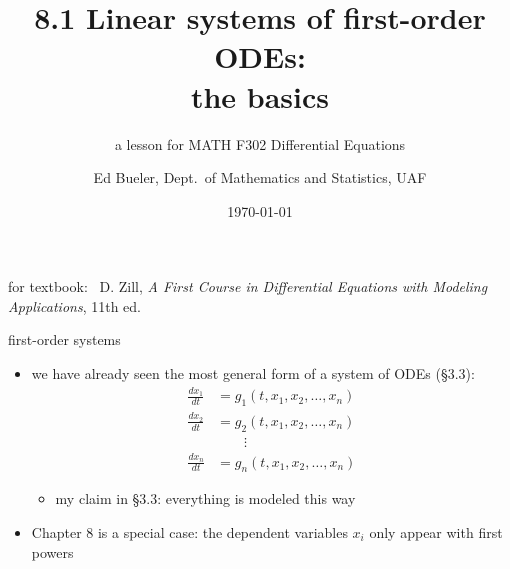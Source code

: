 \documentclass[urlcolor=blue,dvipsnames]{beamer}
\title{8.1 Linear systems of first-order ODEs: \\ the basics}
\subtitle{a lesson for MATH F302 Differential Equations}
\author{Ed Bueler, Dept.~of Mathematics and Statistics, UAF}
\date{\tiny \today}
\begin{document}
\renewcommand{\thefootnote}{{\color{green} \arabic{footnote}}}

\begin{frame}
\titlepage

\centerline{\tiny for textbook: \, D. Zill, \emph{A First Course in Differential Equations with Modeling Applications}, 11th ed.}
\end{frame}

\newcommand{\LL}[1]{\mathcal{L}\left\{#1\right\}}
\newcommand{\LLi}[1]{\mathcal{L}^{-1}\left\{#1\right\}}


\begin{frame}{first-order systems}

\begin{itemize}
\item we have already seen the most general form of a system of ODEs (\S3.3):
\begin{align*}
\frac{dx_1}{dt} &= g_1(t,x_1,x_2,\dots,x_n) \\
\frac{dx_2}{dt} &= g_2(t,x_1,x_2,\dots,x_n) \\
                &\qquad \vdots \\
\frac{dx_n}{dt} &= g_n(t,x_1,x_2,\dots,x_n)
\end{align*}
     \begin{itemize}
     \item my claim in \S3.3: everything is modeled this way
     \end{itemize}
\item Chapter 8 is a special case: the dependent variables $x_i$ only appear with first powers
\end{itemize}
\end{frame}
\end{document}
